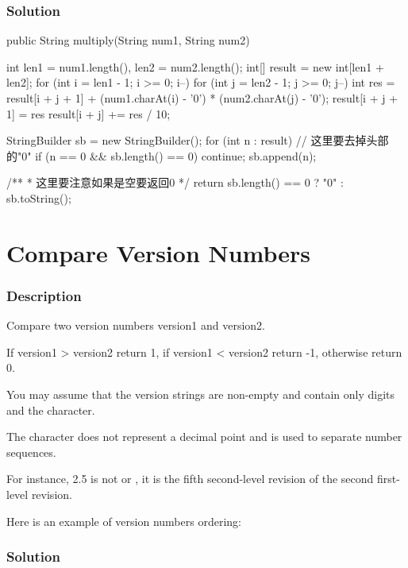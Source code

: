 \subsubsection{Solution}

\begin{Code}
public String multiply(String num1, String num2) {
    int len1 = num1.length(), len2 = num2.length();
    int[] result = new int[len1 + len2];
    for (int i = len1 - 1; i >= 0; i--) {
        for (int j = len2 - 1; j >= 0; j--) {
            int res = result[i + j + 1] + (num1.charAt(i) - '0') * (num2.charAt(j) - '0');
            result[i + j + 1] = res %
            result[i + j] += res / 10;
        }
    }

    StringBuilder sb = new StringBuilder();
    for (int n : result) {
        // 这里要去掉头部的"0"
        if (n == 0 && sb.length() == 0) {
            continue;
        }
        sb.append(n);
    }

    /**
     * 这里要注意如果是空要返回0
     */
    return sb.length() == 0 ? "0" : sb.toString();
}
\end{Code}

\newpage

\section{Compare Version Numbers} %

\subsubsection{Description}
Compare two version numbers version1 and version2.

If version1 > version2 return 1, if version1 < version2 return -1, otherwise return 0.

You may assume that the version strings are non-empty and contain only digits and the  character.

The  character does not represent a decimal point and is used to separate number sequences.

For instance, 2.5 is not  or , it is the fifth second-level revision of the second first-level revision.

Here is an example of version numbers ordering:


\subsubsection{Solution}

\begin{Code}

\end{Code}

\newpage